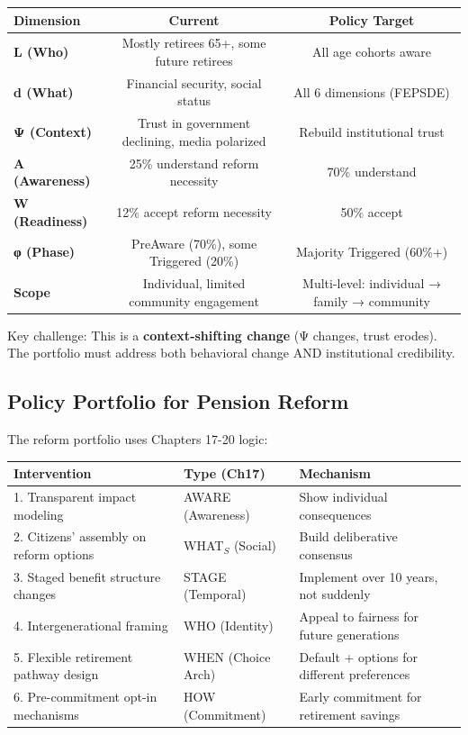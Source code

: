 \begin{center}
\begin{tabular}{@{}lcc@{}}
\toprule
\textbf{Dimension} & \textbf{Current} & \textbf{Policy Target} \\
\midrule
\textbf{L (Who)} & Mostly retirees 65+, some future retirees & All age cohorts aware \\
\textbf{d (What)} & Financial security, social status & All 6 dimensions (FEPSDE) \\
\textbf{Ψ (Context)} & Trust in government declining, media polarized & Rebuild institutional trust \\
\textbf{A (Awareness)} & 25\% understand reform necessity & 70\% understand \\
\textbf{W (Readiness)} & 12\% accept reform necessity & 50\% accept \\
\textbf{φ (Phase)} & PreAware (70\%), some Triggered (20\%) & Majority Triggered (60\%+) \\
\textbf{Scope} & Individual, limited community engagement & Multi-level: individual → family → community \\
\midrule
\end{tabular}
\end{center}

Key challenge: This is a \textbf{context-shifting change} (Ψ changes, trust erodes). The portfolio must address both behavioral change AND institutional credibility.

\subsection{Policy Portfolio for Pension Reform}

The reform portfolio uses Chapters 17-20 logic:

\begin{center}
\begin{tabular}{@{}lll@{}}
\toprule
\textbf{Intervention} & \textbf{Type (Ch17)} & \textbf{Mechanism} \\
\midrule
1. Transparent impact modeling & AWARE (Awareness) & Show individual consequences \\
2. Citizens' assembly on reform options & WHAT$_S$ (Social) & Build deliberative consensus \\
3. Staged benefit structure changes & STAGE (Temporal) & Implement over 10 years, not suddenly \\
4. Intergenerational framing & WHO (Identity) & Appeal to fairness for future generations \\
5. Flexible retirement pathway design & WHEN (Choice Arch) & Default + options for different preferences \\
6. Pre-commitment opt-in mechanisms & HOW (Commitment) & Early commitment for retirement savings \\
\midrule
\end{tabular}
\end{center}


